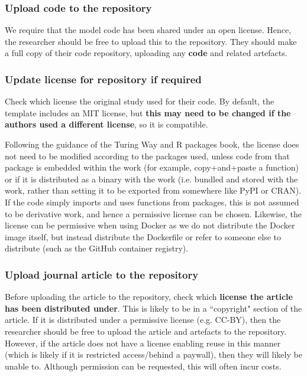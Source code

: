 \vspace{0.5cm}
\subsubsection{Upload code to the repository}

We require that the model code has been shared under an open license. Hence, the researcher should be free to upload this to the repository. They should make a full copy of their code repository, uploading any \textbf{code} and related artefacts.

\vspace{0.5cm}
\subsubsection{Update license for repository if required}

Check which license the original study used for their code. By default, the template\autocite{heather_template_2024} includes an MIT license, but \textbf{this may need to be changed if the authors used a different license}, so it is compatible.

Following the guidance of the Turing Way\autocite{the_turing_way_community_turing_2022} and R packages book,\autocite{wickham_12_2023} the license does not need to be modified according to the packages used, unless code from that package is embedded within the work (for example, copy+and+paste a function) or if it is distributed as a binary with the work (i.e. bundled and stored with the work, rather than setting it to be exported from somewhere like PyPI or CRAN). If the code simply imports and uses functions from packages, this is not assumed to be derivative work, and hence a permissive license can be chosen. Likewise, the license can be permissive when using Docker\autocite{merkel_docker_2014} as we do not distribute the Docker image itself, but instead distribute the Dockerfile or refer to someone else to distribute (such as the GitHub container registry).\autocite{the_linux_foundation_docker_nodate}

\vspace{0.5cm}
\subsubsection{Upload journal article to the repository}

Before uploading the article to the repository, check which \textbf{license the article has been distributed under}. This is likely to be in a ``copyright" section of the article. If it is distributed under a permissive license (e.g. CC-BY), then the researcher should be free to upload the article and artefacts to the repository. However, if the article does not have a license enabling reuse in this manner (which is likely if it is restricted access/behind a paywall), then they will likely be unable to. Although permission can be requested, this will often incur costs.

